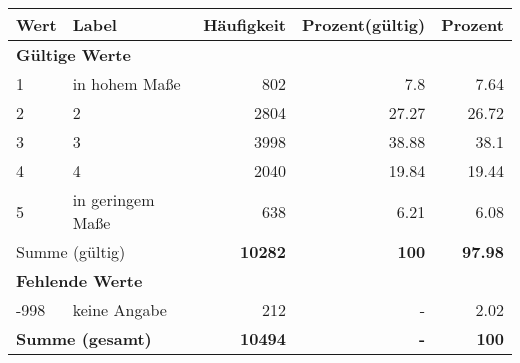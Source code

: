      \begin{longtable}{lXrrr}
     \toprule
     \textbf{Wert} & \textbf{Label} & \textbf{Häufigkeit} & \textbf{Prozent(gültig)} & \textbf{Prozent} \\
     \endhead
     \midrule
     \multicolumn{5}{l}{\textbf{Gültige Werte}}\\

     1 &
     \multicolumn{1}{X}{ in hohem Maße   } &


       \num{802} &
       \num[round-mode=places,round-precision=2]{7.8} &
         \num[round-mode=places,round-precision=2]{7.64} \\

     2 &
     \multicolumn{1}{X}{ 2   } &


       \num{2804} &
       \num[round-mode=places,round-precision=2]{27.27} &
         \num[round-mode=places,round-precision=2]{26.72} \\

     3 &
     \multicolumn{1}{X}{ 3   } &


       \num{3998} &
       \num[round-mode=places,round-precision=2]{38.88} &
         \num[round-mode=places,round-precision=2]{38.1} \\

     4 &
     \multicolumn{1}{X}{ 4   } &


       \num{2040} &
       \num[round-mode=places,round-precision=2]{19.84} &
         \num[round-mode=places,round-precision=2]{19.44} \\

     5 &
     \multicolumn{1}{X}{ in geringem Maße   } &


       \num{638} &
       \num[round-mode=places,round-precision=2]{6.21} &
         \num[round-mode=places,round-precision=2]{6.08} \\
     \midrule
     \multicolumn{2}{l}{Summe (gültig)} &
       \textbf{\num{10282}} &
     \textbf{\num{100}} &
       \textbf{\num[round-mode=places,round-precision=2]{97.98}} \\
     \multicolumn{5}{l}{\textbf{Fehlende Werte}}\\
       -998 &
       keine Angabe &
         \num{212} &
        - &
         \num[round-mode=places,round-precision=2]{2.02} \\
     \midrule
     \multicolumn{2}{l}{\textbf{Summe (gesamt)}} &
          \textbf{\num{10494}} &
        \textbf{-} &
        \textbf{\num{100}} \\
     \bottomrule
     \end{longtable}
     
